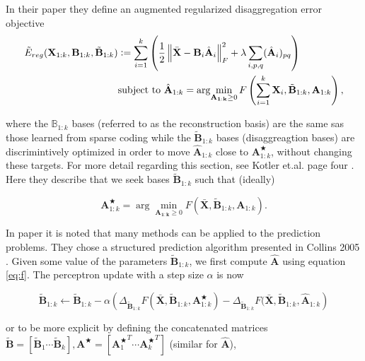 In their paper they define an augmented regularized disaggregation error objective
\begin{equation}
\label{eq:regerror}
\begin{aligned}
\tilde{E}_{reg}(\mathbf{X}_{1:k},\mathbf{B}_{1:k},\tilde{\mathbf{B}}_{1:k})  & \vcentcolon=  \sum_{i=1}^k \left( \frac{1}{2} \left\lVert\bar{\mathbf{X}}-\mathbf{B}_i  \hat{\mathbf{A}}_i\right\rVert_F^2 + \lambda \sum_{i,p,q}(\hat{\mathbf{A}}_i)_{pq} \right) \\
& \text{subject to } \hat{\mathbf{A}}_{1:k} = \arg \! \min_{\mathbf{A_{1:k}} \geq 0} F\left(\sum_{i=1}^k \mathbf{X}_i,\tilde{\mathbf{B}}_{1:k},\mathbf{A}_{1:k}\right),
\end{aligned}
\end{equation}

where the $\mathbb{B}_{1:k}$ bases (referred to as the reconstruction basis) are the same sas those learned from sparse coding while the $\tilde{\mathbf{B}}_{1:k}$ bases (disaggreagtion bases) are discrimintively optimized in order to move $\hat{\mathbf{A}}_{1:k}$ close to $\mathbf{A}_{1:k}^{\bigstar}$, without changing these targets. For more detail regarding this section, see Kotler et.al. page four \cite{DDSC}. Here they describe that we seek bases $\tilde{\mathbf{B}}_{1:k}$ such that (ideally)

\begin{equation}
\mathbf{A}_{1:k}^\bigstar = \arg \! \min_{\mathbf{A_{1:k}} \geq 0} F ( \bar{\mathbf{X}}, \tilde{\mathbf{B}}_{1:k},\mathbf{A}_{1:k}).
\end{equation}

In paper \cite{DDSC} it is noted that many methods can be applied to the prediction problems. They chose a structured prediction algorithm presented in Collins 2005 \cite{collins}. Given some value of the parameters $\tilde{\mathbf{B}}_{1:k}$, we first compute $\hat{\mathbf{A}}$ using equation \ref{eq:f}. The perceptron update with a step size $\alpha$ is now

\begin{equation}
\tilde{\mathbf{B}}_{1:k} \leftarrow \tilde{\mathbf{B}}_{1:k} - \alpha \left( \Delta_{\tilde{\mathbf{B}}_{1:k}} F(\bar{\mathbf{X}},\tilde{\mathbf{B}}_{1:k},\mathbf{A}_{1:k}^\bigstar) - \Delta_{\tilde{\mathbf{B}}_{1:k}} F(\bar{\mathbf{X}},\tilde{\mathbf{B}}_{1:k},\hat{\mathbf{A}}_{1:k} \right)
\end{equation}

or to be more explicit by defining the concatenated matrices $\tilde{\mathbf{B}} = [ \tilde{\mathbf{B}}_1 \cdots \tilde{\mathbf{B}}_k ], \mathbf{A}^\bigstar = [{\mathbf{A}_1^\bigstar}^T \cdots{\mathbf{A}_k^\bigstar}^T ]$ (similar for $\hat{\mathbf{A}}$),

